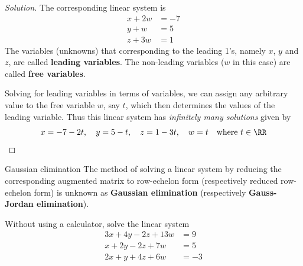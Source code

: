\begin{proof}[Solution]
The corresponding linear system is
\begin{align*}
x + 2w &= -7 \\
y + w &= 5 \\
z + 3w &= 1
\end{align*}
The variables (unknowns) that corresponding to the leading 1's, namely $x$, $y$ and $z$, are called \textbf{leading variables}. The non-leading variables ($w$ in this case) are called \textbf{free variables}.

Solving for leading variables in terms of variables, we can assign any arbitrary value to the free variable $w$, say $t$, which then determines the values of the leading variable. Thus this linear system has \emph{infinitely many solutions} given by
\[ x=-7-2t, \quad y=5-t, \quad z=1-3t, \quad w=t \quad \text{where } t\in\RR \]
\end{proof}

\begin{defn}{Gaussian elimination}{}
The method of solving a linear system by reducing the corresponding augmented matrix to row-echelon form (respectively reduced row-echelon form) is unknown as \textbf{Gaussian elimination} (respectively \textbf{Gauss-Jordan elimination}).
\end{defn}

\begin{exmp}{}{}
Without using a calculator, solve the linear system
\begin{align*}
3x + 4y - 2z + 13w &= 9 \\
x + 2y - 2z + 7w &= 5 \\
2x + y + 4z + 6w &= -3
\end{align*}
\end{exmp}

